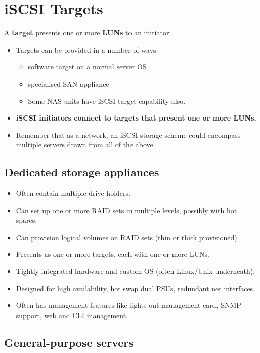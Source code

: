 \documentclass[slides]{pgnotes}
\begin{document}

\section{iSCSI Targets}
\label{sec:iscsi-targets}

A \textbf{target} presents one or more \textbf{LUNs} to an initiator:
\begin{itemize}
\item Targets can be provided in a number of ways:
  \begin{itemize}
  \item software target on a normal server OS
  \item specialised SAN appliance
  \item Some NAS units have iSCSI target capability also.
  \end{itemize}
\item \textbf{iSCSI initiators connect to targets that present one or more LUNs.}
\item Remember that as a network, an iSCSI storage scheme could encompass
multiple servers drawn from all of the above.
\end{itemize}

\subsection{Dedicated storage appliances}

\begin{itemize}
\item
  Often contain multiple drive holders.
\item
  Can set up one or more RAID sets in multiple levels, possibly with hot spares.
\item
  Can provision logical volumes on RAID sets (thin or thick provisioned)
\item
  Presents as one or more targets, each with one or more LUNs.
\item
  Tightly integrated hardware and custom OS (often Linux/Unix underneath).
\item
  Designed for high availability, hot swap dual PSUs, redundant net interfaces.
\item
  Often has management features like lights-out management card, SNMP support, web and CLI management.
\end{itemize}

\subsection{General-purpose servers}
\end{document}
